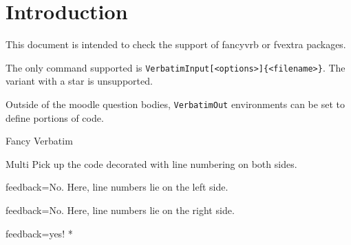 \documentclass{article}
\newif\iffvextra
\begin{document}
\section*{Introduction}

This document is intended to check the support of \textsf{fancyvrb} or  
\textsf{fvextra} packages.

The only command supported is \texttt{VerbatimInput[<options>]\{<filename>\}}.
The variant with a star is unsupported.

Outside of the moodle question bodies, \texttt{VerbatimOut} environments can be 
set to define portions of code.

\begin{quiz}{Fancy Verbatim}

\begin{multi}{Multi}
Pick up the code decorated with line numbering on both sides.
\item[feedback={No. Here, line numbers lie on the left side.}] 
\item[feedback={No. Here, line numbers lie on the right side.}] 
\item[feedback={yes!}]* 
\end{multi}

\end{quiz}
\end{document}
